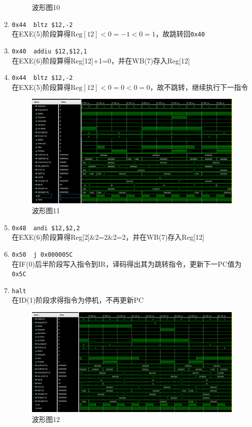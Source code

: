 \begin{enumerate}
\begin{figure}[H]
\caption{波形图10}
\label{fig:wave_10}
\end{figure}
    \item \verb'0x44  bltz $12,-2'\\
    在EXE(5)阶段算得$\mathrm{Reg}[12]<0=-1<0=1$，故跳转回\verb'0x40'
    \item \verb'0x40  addiu $12,$12,1'\\
    在EXE(6)阶段算得Reg[12]+1=0，并在WB(7)存入Reg[12]
    \item \verb'0x44  bltz $12,-2'\\
    在EXE(5)阶段算得$\mathrm{Reg}[12]<0=0<0=0$，故不跳转，继续执行下一指令
\begin{figure}[H]
\centering
\includegraphics[width=0.9\linewidth]{fig/FullIns/Ins11.PNG}
\caption{波形图11}
\label{fig:wave_11}
\end{figure}
    \item \verb'0x48  andi $12,$2,2'\\
    在EXE(6)阶段算得Reg[2]\&2=2\&2=2，并在WB(7)存入Reg[12]
    \item \verb'0x50  j 0x000005C'\\
    在IF(0)后半阶段写入指令到IR，译码得出其为跳转指令，更新下一PC值为\verb'0x5C'
    \item \verb'halt'\\
    在ID(1)阶段求得指令为停机，不再更新PC
\begin{figure}[H]
\centering
\includegraphics[width=0.9\linewidth]{fig/FullIns/Ins12.PNG}
\caption{波形图12}
\label{fig:wave_12}
\end{figure}
\end{enumerate}